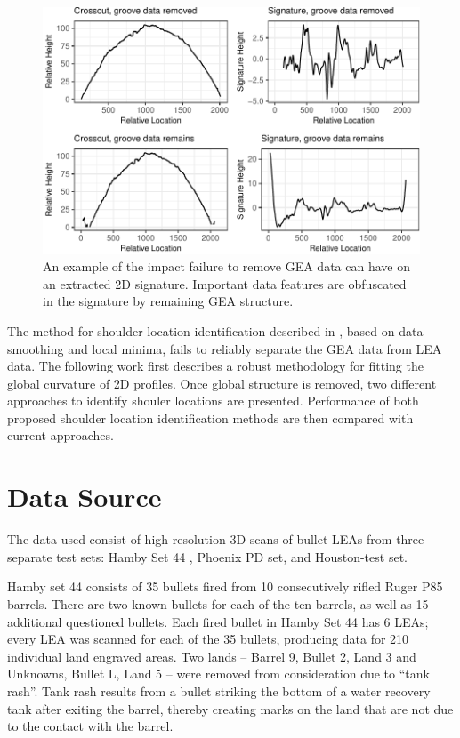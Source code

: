 \documentclass[12pt]{article}
\begin{document}
\begin{figure}
\centering
\includegraphics{writeup_files/figure-latex/groove-no-groove-1.pdf}
\caption{\label{groove-no-groove}An example of the impact failure to
remove GEA data can have on an extracted 2D signature. Important data
features are obfuscated in the signature by remaining GEA structure.}
\end{figure}

The method for shoulder location identification described in
\citet{Hare1}, based on data smoothing and local minima, fails to
reliably separate the GEA data from LEA data. The following work first
describes a robust methodology for fitting the global curvature of 2D
profiles. Once global structure is removed, two different approaches to
identify shouler locations are presented. Performance of both proposed
shoulder location identification methods are then compared with current
approaches.

\section{Data Source}

The data used consist of high resolution 3D scans of bullet LEAs from
three separate test sets: Hamby Set 44 \citep{Hamby}, Phoenix PD set,
and Houston-test set.

Hamby set 44 consists of 35 bullets fired from 10 consecutively rifled
Ruger P85 barrels. There are two known bullets for each of the ten
barrels, as well as 15 additional questioned bullets. Each fired bullet
in Hamby Set 44 has 6 LEAs; every LEA was scanned for each of the 35
bullets, producing data for 210 individual land engraved areas. Two
lands -- Barrel 9, Bullet 2, Land 3 and Unknowns, Bullet L, Land 5 --
were removed from consideration due to ``tank rash''. Tank rash results
from a bullet striking the bottom of a water recovery tank after exiting
the barrel, thereby creating marks on the land that are not due to the
contact with the barrel.
\end{document}
